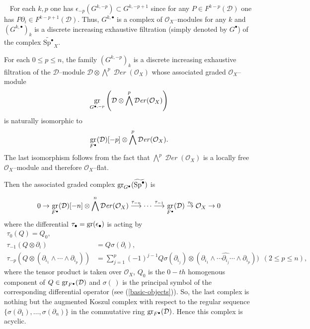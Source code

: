 \documentclass[12pt]{article}
\DeclareMathOperator{\gr}{\rm gr}
\DeclareMathOperator{\fDer}{\mathcal{D}\mathit{er}}
\newcommand{\OO}{\mathcal{O}}
\newcommand{\DD}{\mathcal{D}}
\newcommand{\Spb}{{\mathrm{Sp}}^\bullet} %
\newcommand{\cO}{\OO}
\newcounter{numero}[section]
\renewcommand{\thenumero}{(\arabic{section}.\arabic{numero})}
\newenvironment{nota}{\medskip
\refstepcounter{numero}\noindent {\sc  \thenumero\ Remark.}\
}{\vspace{1ex}\par}
\begin{document}
\begin{nota}
For each $k,p$ one has $\epsilon_{-p} (G^{k,-p}) \subset G^{k,-p+1}$ since for any $P\in F^{k-p}(\DD)$ one has $P\partial_i \in F^{k-p+1}(\DD)$. Thus, $G^{k,\bullet}$ is a complex of $\cO_X$--modules for any $k$ and $(G^{k,\bullet})_k$ is a discrete increasing exhaustive filtration (simply denoted by $G^\bullet$) of the complex $\widetilde{\Spb}_{X}$.

For each $0 \leq p \leq n$, the family $(G^{k,-p})_k$ is a discrete increasing exhaustive filtration of the $\DD$--module $\DD\otimes \bigwedge^p \fDer(\cO_X)$ whose associated graded $\cO_X$--module  $$\gr_{G^{\bullet,-p}}\left(\DD\otimes \bigwedge^p \fDer(\cO_X)\right)$$ is naturally isomorphic to
$$\gr_{F^\bullet}(\DD)[-p]\otimes \bigwedge^p \fDer(\cO_X).$$
The last isomorphism follows from the fact that  $\bigwedge^p \fDer(\cO_X)$ is a locally free $\cO_X$--module and therefore $\cO_X$--flat.

Then the associated graded complex $\gr_{G^\bullet}(\widetilde{\Spb})$ is

\begin{equation*}
0 \rightarrow \gr_{F^\bullet}(\DD)[-n] \otimes \bigwedge^n \fDer(\cO_X) \stackrel{\tau_{-n}}{\longrightarrow} \cdots \stackrel{\tau_{-1}}{\longrightarrow} \gr_{F^\bullet}(\DD)   \stackrel{\tau_{0}}\rightarrow \cO_X  \rightarrow 0
\end{equation*} where the differential $\tau_\bullet=\gr(\epsilon_\bullet)$ is acting by
\begin{equation*}
\begin{split}
\tau_0(Q)=Q_0,\\
\tau_{-1}(Q\otimes \partial_i) & = Q\sigma(\partial_i), \\
\tau_{-p}(Q\otimes (\partial_{i_1} \wedge \cdots \wedge \partial_{i_p})) & = \sum_{j=1}^p (-1)^{j-1}Q\sigma(\partial_{i_j}) \otimes (\partial_{i_1} \wedge \cdots \widehat{\partial_{i_j}} \cdots \wedge \partial_{i_p})) \,\,\, (2\leq p\leq n),
\end{split}
\end{equation*}
where the tensor product is taken over $\cO_X$,  $Q_0$ is the $0-th$ homogenous component of $Q\in \gr_{F^\bullet}(\DD)$ and $\sigma(\,)$ is the principal symbol of the corresponding differential operator (see (\ref{basic-objects})).
So, the last complex is nothing but the augmented Koszul complex with respect to the regular sequence $\{\sigma(\partial_1), \ldots, \sigma(\partial_n)\}$ in the commutative ring $\gr_{F^\bullet}(\DD)$. Hence this complex is acyclic.
\end{nota}
\end{document}
